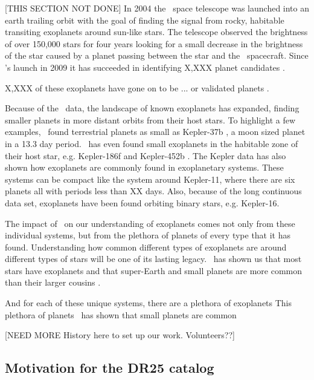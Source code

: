 [THIS SECTION NOT DONE]
In 2004 the \Kepler\ space telescope was launched into an earth trailing orbit with the goal of finding the signal from rocky, habitable transiting exoplanets \citep{Koch2010} around sun-like stars. The telescope observed the brightness of over 150,000 stars for four years looking for a small decrease in the brightness of the star caused by a planet passing between the star and the \Kepler\ spacecraft. 
Since \Kepler's launch in 2009 it has succeeded in identifying X,XXX planet candidates \citep{Borucki2010a,Coughlin2016}. 

X,XXX of these exoplanets have gone on to be ... or validated planets \citep[see most recently][]{Morton2016}.  %

Because of the \Kepler\ data, the landscape of known exoplanets has expanded, finding smaller planets in more distant orbits from their host stars.  To highlight a few examples,  \Kepler\ found terrestrial planets as small as Kepler-37b \citep{Barclay2013}, a moon sized planet in a 13.3 day period. \Kepler\ has even found small exoplanets in the habitable zone of their host star, e.g. Kepler-186f \citep{Quintana2014} and Kepler-452b \citep{Jenkins2015}.  The Kepler data has also shown how exoplanets are commonly found in exoplanetary systems. These systems can be compact like the system around Kepler-11, where there are six planets all with periods less than XX days. Also, because of the long continuous data set, exoplanets have been found orbiting binary stars, e.g. Kepler-16\citep{Doyle2011}.


The impact of \Kepler\ on our understanding of exoplanets comes not only from these individual systems, but from the plethora of planets of every type that it has found. Understanding how common different types of exoplanets are around different types of stars will be one of its lasting legacy. \Kepler\ has shown us that most stars have exoplanets and that super-Earth and small planets are more common than their larger cousins \citet{Burke2015}.  

And for each of these unique systems, there are a plethora of exoplanets This plethora of planets \Kepler\ has shown that small planets are common 


[NEED MORE History here to set up our work. Volunteers??]

\subsection{Motivation for the DR25 catalog}

